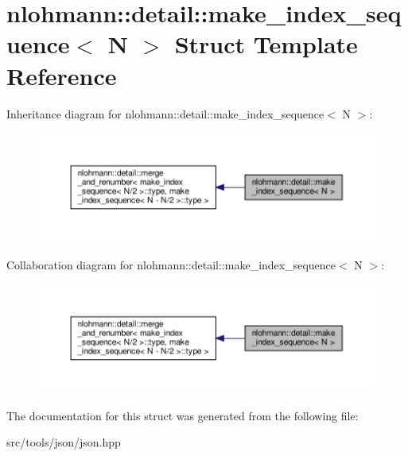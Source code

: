 \hypertarget{structnlohmann_1_1detail_1_1make__index__sequence}{}\section{nlohmann\+:\+:detail\+:\+:make\+\_\+index\+\_\+sequence$<$ N $>$ Struct Template Reference}
\label{structnlohmann_1_1detail_1_1make__index__sequence}


Inheritance diagram for nlohmann\+:\+:detail\+:\+:make\+\_\+index\+\_\+sequence$<$ N $>$\+:
\nopagebreak
\begin{figure}[H]
\begin{center}
\leavevmode
\includegraphics[width=350pt]{structnlohmann_1_1detail_1_1make__index__sequence__inherit__graph}
\end{center}
\end{figure}


Collaboration diagram for nlohmann\+:\+:detail\+:\+:make\+\_\+index\+\_\+sequence$<$ N $>$\+:
\nopagebreak
\begin{figure}[H]
\begin{center}
\leavevmode
\includegraphics[width=350pt]{structnlohmann_1_1detail_1_1make__index__sequence__coll__graph}
\end{center}
\end{figure}


The documentation for this struct was generated from the following file\+:\begin{DoxyCompactItemize}
\item 
src/tools/json/json.\+hpp\end{DoxyCompactItemize}

